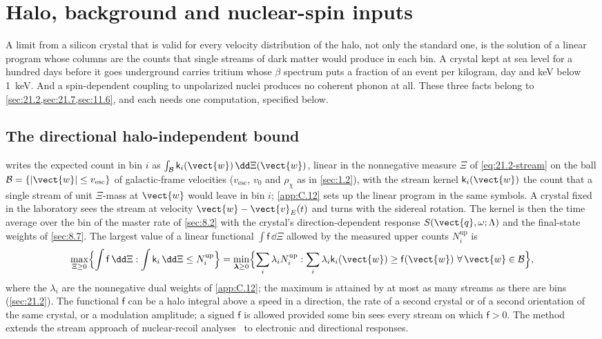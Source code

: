 \section{Halo, background and nuclear-spin inputs}\label{app:E.27}

A limit from a silicon crystal that is valid for every velocity distribution of the halo, not only the standard one, is the solution of a linear program whose columns are the counts that single streams of dark matter would produce in each bin. A crystal kept at sea level for a hundred days before it goes underground carries tritium whose $\beta$ spectrum puts a fraction of an event per kilogram, day and keV below \SI{1}{keV}. And a spin-dependent coupling to unpolarized nuclei produces no coherent phonon at all. These three facts belong to \cref{sec:21.2,sec:21.7,sec:11.6}, and each needs one computation, specified below.

\subsection{The directional halo-independent bound}

 writes the expected count in bin $i$ as $\int_{\mathcal{B}}\mathsf{k}_i(\vect{w})\,\dd\Xi(\vect{w})$, linear in the nonnegative measure $\Xi$ of \cref{eq:21.2-stream} on the ball $\mathcal{B} = \{|\vect{w}| \le v_{\mathrm{esc}}\}$ of galactic-frame velocities ($v_{\mathrm{esc}}$, $v_0$ and $\rho_\chi$ as in \cref{sec:1.2}), with the stream kernel $\mathsf{k}_i(\vect{w})$ the count that a single stream of unit $\Xi$-mass at $\vect{w}$ would leave in bin $i$; \cref{app:C.12} sets up the linear program in the same symbols. A crystal fixed in the laboratory sees the stream at velocity $\vect{w} - \vect{v}_E(t)$ and turns with the sidereal rotation. The kernel is then the time average over the bin of the master rate of \cref{sec:8.2} with the crystal's direction-dependent response $S(\vect{q}, \omega; \Lambda)$ and the final-state weights of \cref{sec:8.7}. The largest value of a linear functional $\int\mathsf{f}\,\dd\Xi$ allowed by the measured upper counts $N_i^{\mathrm{up}}$ is
\begin{equation}
  \max_{\Xi \ge 0}\Bigl\{\int\mathsf{f}\,\dd\Xi : \int\mathsf{k}_i\,\dd\Xi \le N_i^{\mathrm{up}}\Bigr\}
  = \min_{\boldsymbol{\lambda} \ge 0}\Bigl\{\sum_i\lambda_iN_i^{\mathrm{up}} : \sum_i\lambda_i\mathsf{k}_i(\vect{w}) \ge \mathsf{f}(\vect{w})\ \forall\,\vect{w} \in \mathcal{B}\Bigr\},
  \label{eq:E.27-lp}
\end{equation}
where the $\lambda_i$ are the nonnegative dual weights of \cref{app:C.12}; the maximum is attained by at most as many streams as there are bins (\cref{sec:21.2}). The functional $\mathsf{f}$ can be a halo integral above a speed in a direction, the rate of a second crystal or of a second orientation of the same crystal, or a modulation amplitude; a signed $\mathsf{f}$ is allowed provided some bin sees every stream on which $\mathsf{f} > 0$. The method extends the stream approach of nuclear-recoil analyses~\cite{feldstein2014new,ibarra2017optimized} to electronic and directional responses.

